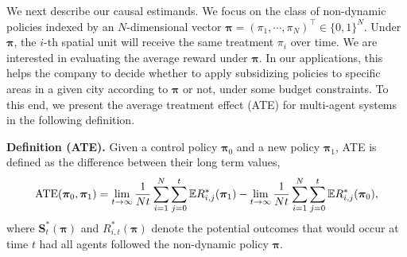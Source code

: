 \documentclass{article}
\newcommand{\Mean}{{\mathbb{E}}}
\begin{document}
We next describe our causal estimands. We focus on the class of non-dynamic policies indexed by an $N$-dimensional vector $\bm{\pi}=(\pi_1,\cdots,\pi_N)^\top \in \{0,1\}^N$. Under $\bm{\pi}$, the $i$-th spatial unit will receive the same treatment $\pi_i$ over time. We are interested in evaluating the average reward under $\bm{\pi}$. In our applications, this helps the company to decide whether to apply subsidizing policies to specific areas in a given city according to $\bm{\pi}$ or not, under some budget constraints. To this end, 
we present the average treatment effect (ATE) for multi-agent systems in the following definition. 

\textbf{Definition (ATE).} Given a control policy $\bm{\pi}_0$ and a new policy $\bm{\pi}_1$, ATE is defined as the difference between their long term values, 
\vspace{-0.2cm}
\begin{eqnarray}\label{eqn:ATE}
\hbox{ATE}(\bm{\pi}_0,\bm{\pi}_1)=\lim_{t\to \infty} \frac{1}{N t}\sum_{i=1}^N \sum_{j=0}^t \Mean R_{i,j}^*(\bm{\pi}_1)-\lim_{t\to \infty} \frac{1}{N t}\sum_{i=1}^N \sum_{j=0}^t \Mean R_{i,j}^*(\bm{\pi}_0),%
\end{eqnarray}
where $\bm{S}^*_t(\bm{\pi})$ and $R_{i,t}^*(\bm{\pi})$ denote the potential outcomes that would occur at time $t$ had all agents followed the non-dynamic policy $\bm{\pi}$. %
\end{document}

